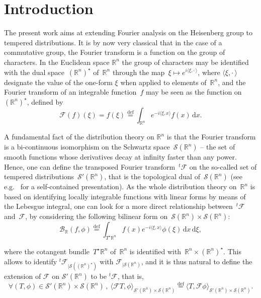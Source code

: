 \documentclass[11pt]{article}
\theoremstyle{definition}
\numberwithin{equation}{section}
\numberwithin{figure}{section}
\numberwithin{table}{section}
\newcommand{\wh}{\widehat}
\newcommand*\cB{\mathcal{B}}
\newcommand*\cF{\mathcal{F}}
\newcommand*\cS{\mathcal{S}}
\newcommand*\R{\mathbb{R}}
\newcommand*\eqdefa{\overset{\mathrm{def}}{=}}
\newcommand*{\dd}{\mathrm{d}}
\newcommand{\dx}{\dd x}
\newcommand{\dxi}{\dd \xi}
\let\oldforall\forall
\renewcommand*{\forall}{\mathrel{\oldforall}}
\begin{document}
\section{Introduction}

The present work aims at extending Fourier analysis on the Heisenberg group to tempered distributions. It is by now very classical that in the case of a commutative group, the Fourier transform is a function on the group of characters. In the Euclidean space $\R^n$ the group of characters may be identified with the dual space~$(\R^n)^\star$ of~$\R^n$ through the map~$\xi \mapsto e^{i\langle \xi,{\cdot\,}\rangle}$, where $\langle \xi,{\cdot\,}\rangle$ designate the value of the one-form $\xi$ when applied to elements of~$\R^n$, and the Fourier transform of an integrable function~$f$ may be seen as the function on $(\R^n)^\star$, defined by
\begin{equation}\label{definFourierclassic}
\cF (f) (\xi) = \wh f(\xi)\eqdefa \int_{\R^n} e^{-i\langle \xi,x\rangle } f(x)\, \dx.
\end{equation}

A fundamental fact of the distribution theory on $\R^n$ is that the Fourier transform is a bi-continuous isomorphism on the Schwartz space~$\cS(\R^n)$ -- the set of smooth functions whose derivatives decay at infinity faster than any power. Hence, one can define the transposed Fourier transform~${}^t\!\cF$ on the so-called set of tempered distributions~$\cS'(\R^n)$, that is the topological dual of~$\cS(\R^n)$ (see e.g.~\cite{rudin, S} for a self-contained presentation). As the whole distribution theory on~$\R^n$ is based on identifying locally integrable functions with linear forms by means of the Lebesgue integral, one can look for a more direct relationship between~${}^t\!\cF$ and~$\cF$, by considering the following bilinear form on~$\cS(\R^n)\times\cS(\R^n)$:
\begin{equation}\label{definFourierRbilin}
\cB_\R (f,\phi)\eqdefa \int_{T^\star \R^n} f(x) e^{-i\langle \xi,x\rangle} \phi(\xi) \,\dx \,\dxi,
\end{equation}

where the cotangent bundle~$T^\star \R^n$ of~$\R^n$ is identified with~$\R^n\times (\R^n)^\star$. This allows to identify ${}^t\!\cF_{|\cS((\R^n)^\star)}$ with $\cF_{|\cS(\R^n)}$, and it is thus natural to define the extension of $\cF$ on $\cS'(\R^n)$ to be ${}^t\!\cF$, that is,
\begin{equation}\label{definFourierS'}
\forall (T,\phi) \in \cS'(\R^n)\times\cS(\R^n)\,,\ \langle \cF T,\phi\rangle_{\cS'(\R^n)\times\cS(\R^n)}\eqdefa \langle T,\cF \phi\rangle_{\cS'(\R^n)\times\cS(\R^n)}.
\end{equation}
\end{document}
